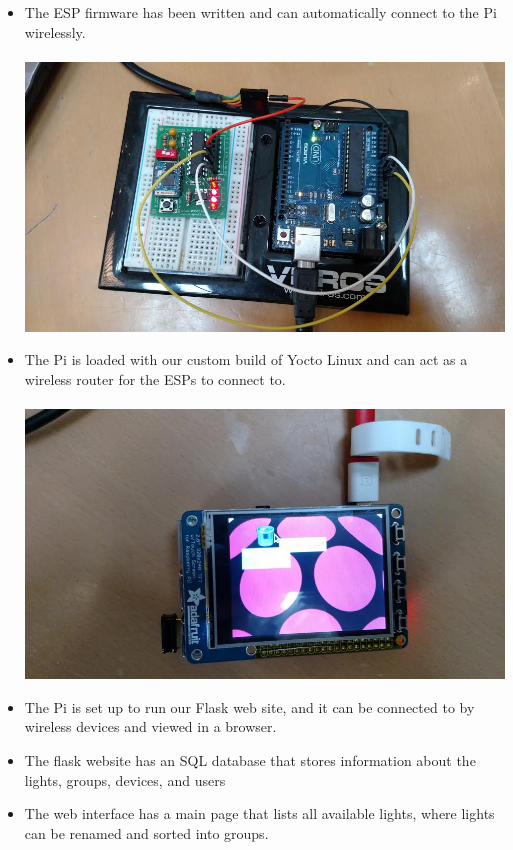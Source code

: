 \documentclass[oneside,openright]{book}
\begin{document}
\begin{itemize}
    \item The ESP firmware has been written and can automatically connect to
        the Pi wirelessly. \\ \\
      \includegraphics[width=1.0\textwidth]{pi-esp.png}
    \item The Pi is loaded with our custom build of Yocto Linux and can act as
        a wireless router for the ESPs to connect to. \\ \\
      \includegraphics[width=1.0\textwidth]{pi-screen.png}
    \item The Pi is set up to run our Flask web site, and it can be connected 
        to by wireless devices and viewed in a browser.
    \item The flask website has an SQL database that stores information about 
        the lights, groups, devices, and users
    \item The web interface has a main page that lists all available lights,
        where lights can be renamed and sorted into groups. \\ \\

\end{itemize}
\end{document}
